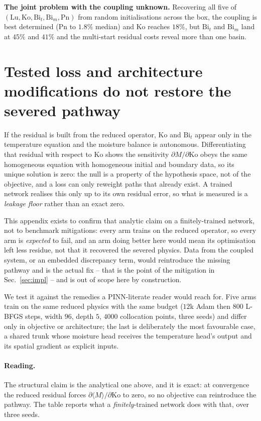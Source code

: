 \documentclass{article}
\begin{document}
\textbf{The joint problem with the coupling unknown.} Recovering all five of
$(\mathrm{Lu},\mathrm{Ko},\mathrm{Bi}_t,\mathrm{Bi}_m,\mathrm{Pn})$ from random initialisations across
the box, the coupling is best determined ($\mathrm{Pn}$ to $1.8\%$ median) and $\mathrm{Ko}$ reaches
$18\%$, but $\mathrm{Bi}_t$ and $\mathrm{Bi}_m$ land at $45\%$ and $41\%$ and the multi-start residual
costs reveal more than one basin.

\section{Tested loss and architecture modifications do not restore the severed pathway}\label{app:e1}
If the residual is built from the reduced operator, $\mathrm{Ko}$ and $\mathrm{Bi}_t$ appear only in
the temperature equation and the moisture balance is autonomous. Differentiating that residual with
respect to $\mathrm{Ko}$ shows the sensitivity $\partial M/\partial\mathrm{Ko}$ obeys the same
homogeneous equation with homogeneous initial and boundary data, so its unique solution is zero: the
null is a property of the hypothesis space, not of the objective, and a loss can only reweight paths
that already exist. A trained network realises this only up to its own residual error, so what is
measured is a \emph{leakage floor} rather than an exact zero.

This appendix exists to confirm that analytic claim on a finitely-trained network, not to benchmark
mitigations: every arm trains on the reduced operator, so every arm is \emph{expected} to fail, and
an arm doing better here would mean its optimisation left less residue, not that it recovered the
severed physics. Data from the coupled system, or an embedded discrepancy term, would reintroduce
the missing pathway and is the actual fix -- that is the point of the mitigation in
Sec.~\ref{sec:impl} -- and is out of scope here by construction.

We test it against the remedies a PINN-literate reader would reach for. Five arms train on the same
reduced physics with the same budget ($12$k Adam then $800$ L-BFGS steps, width $96$, depth $5$,
$4000$ collocation points, three seeds) and differ only in objective or architecture; the last is
deliberately the most favourable case, a shared trunk whose moisture head receives the temperature
head's output and its spatial gradient as explicit inputs.



\paragraph{Reading.} The structural claim is the analytical one above, and it is exact: at convergence
the reduced residual forces $\partial\langle M\rangle/\partial\mathrm{Ko}$ to zero, so no objective can
reintroduce the pathway. The table reports what a \emph{finitely}-trained network does with that, over
three seeds.
\end{document}
